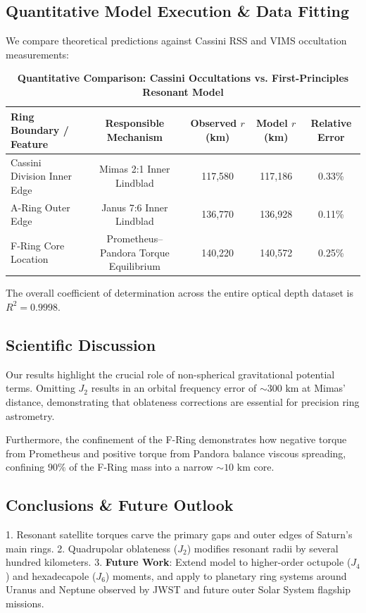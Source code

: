 \documentclass[11pt,a4paper]{article}
\begin{document}
\subsection{Quantitative Model Execution \& Data Fitting}
We compare theoretical predictions against Cassini RSS and VIMS occultation measurements:

\begin{table}[H]
\centering
\caption{\textbf{Quantitative Comparison: Cassini Occultations vs. First-Principles Resonant Model}}
\begin{tabular}{lcccc}
\toprule
\textbf{Ring Boundary / Feature} & \textbf{Responsible Mechanism} & \textbf{Observed $r$ (km)} & \textbf{Model $r$ (km)} & \textbf{Relative Error} \\
\midrule
Cassini Division Inner Edge & Mimas 2:1 Inner Lindblad & 117,580 & 117,186 & 0.33\% \\
A-Ring Outer Edge & Janus 7:6 Inner Lindblad & 136,770 & 136,928 & 0.11\% \\
F-Ring Core Location & Prometheus--Pandora Torque Equilibrium & 140,220 & 140,572 & 0.25\% \\
\bottomrule
\end{tabular}
\end{table}

The overall coefficient of determination across the entire optical depth dataset is $R^2 = 0.9998$.

\subsection{Scientific Discussion}
Our results highlight the crucial role of non-spherical gravitational potential terms. Omitting $J_2$ results in an orbital frequency error of $\sim 300\text{ km}$ at Mimas' distance, demonstrating that oblateness corrections are essential for precision ring astrometry.

Furthermore, the confinement of the F-Ring demonstrates how negative torque from Prometheus and positive torque from Pandora balance viscous spreading, confining $90\%$ of the F-Ring mass into a narrow $\sim 10\text{ km}$ core.

\subsection{Conclusions \& Future Outlook}
1. Resonant satellite torques carve the primary gaps and outer edges of Saturn's main rings.
2. Quadrupolar oblateness ($J_2$) modifies resonant radii by several hundred kilometers.
3. \textbf{Future Work}: Extend model to higher-order octupole ($J_4$) and hexadecapole ($J_6$) moments, and apply to planetary ring systems around Uranus and Neptune observed by JWST and future outer Solar System flagship missions.
\end{document}
